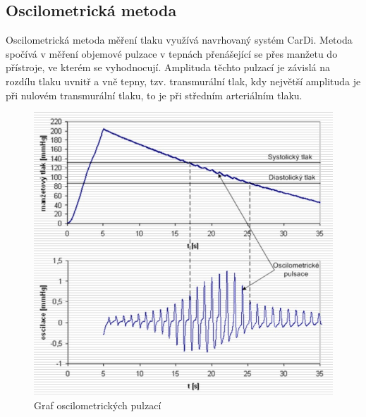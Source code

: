 \subsection{Oscilometrická metoda}
Oscilometrická metoda měření tlaku využívá navrhovaný systém CarDi. Metoda spočívá v měření objemové pulzace v tepnách přenášející se přes manžetu do přístroje, ve kterém se vyhodnocují.
Amplituda těchto pulzací je závislá na rozdílu tlaku uvnitř a vně tepny, tzv. transmurální tlak, kdy největší amplituda je při nulovém transmurální tlaku, to je při středním arteriálním tlaku.
\cite{cite:Fabian}
\begin{figure}[H]
    \caption{Graf oscilometrických pulzací \cite{cite:Fabian}}
    \includegraphics[width=1\textwidth]{pictures/oscilometricky_tlak.jpg}
\end{figure}
\raggedbottom
